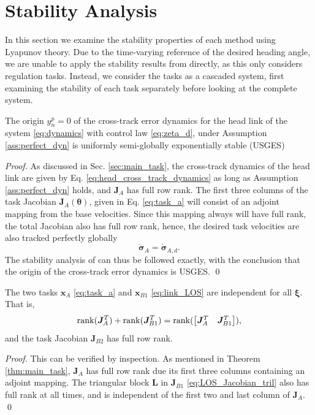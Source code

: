 \documentclass[../main.tex]{subfiles}
\begin{document}
\section{Stability Analysis}
\label{sec:stability}
In this section we examine the stability properties of each method using Lyapunov theory. Due to the time-varying reference of the desired heading angle, we are unable to apply the stability results from \cite{antonelli2009} directly, as this only considers regulation tasks. Instead, we consider the tasks as a cascaded system, first examining the stability of each task separately before looking at the complete system.

\begin{theorem}
    \label{thm:main_task}
    The origin $y^p_n = 0$ of the cross-track error dynamics for the head link of the system \eqref{eq:dynamics} with control law \eqref{eq:zeta_d}, under Assumption \ref{ass:perfect_dyn} is uniformly semi-globally exponentially stable (USGES)
\end{theorem}

\begin{proof}
As discussed in Sec. \ref{sec:main_task}, the cross-track dynamics of the head link are given by Eq. \eqref{eq:head_cross_track_dynamics} as long as Assumption \ref{ass:perfect_dyn} holds, and $\bm{J}_A$ has full row rank. The first three columns of the task Jacobian $\bm{J}_A(\bm{\theta})$, given in Eq. \eqref{eq:task_a} will consist of an adjoint mapping from the base velocities. Since this mapping always will have full rank, the total Jacobian also has full row rank, hence, the desired task velocities are also tracked perfectly globally
\begin{equation}
    \dot{\bm{\sigma}}_A = \dot{\bm{\sigma}}_{A,d}.
\end{equation}
The stability analysis of \cite{fossen2014} can thus be followed exactly, with the conclusion that the origin of the cross-track error dynamics is USGES. \qed
\end{proof}


\begin{proposition}
    \label{prop:independent_B1}
The two tasks $\bm{x}_A$ \eqref{eq:task_a} and $\bm{x}_{B1}$ \eqref{eq:link_LOS} are independent \citep{antonelli2009} for all $\bm{\xi}$. That is,
\begin{equation}
    \operatorname{rank}(\bm{J}_A^T) + \operatorname{rank}(\bm{J}_{B1}^T) = \operatorname{rank}(\begin{bmatrix}
        \bm{J}_A^T & \bm{J}_{B1}^T
    \end{bmatrix}),
\end{equation}
and the task Jacobian $\bm{J}_{B2}$ has full row rank.
\end{proposition}
\begin{proof}
    This can be verified by inspection. As mentioned in Theorem \ref{thm:main_task}, $\bm{J}_A$ has full row rank due its first three columns containing an adjoint mapping. The triangular block $\bm{L}$ in $\bm{J}_{B1}$ \eqref{eq:LOS_Jacobian_tril} also has full rank at all times, and is independent of the first two and last column of $\bm{J}_A$. \qed
\end{proof}
\end{document}
